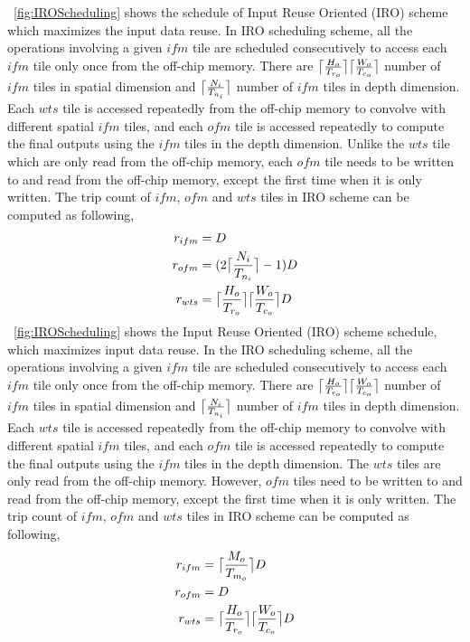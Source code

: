  \figurename~\ref{fig:IROScheduling} shows the schedule of Input Reuse Oriented (IRO) scheme which maximizes the input data reuse. In IRO scheduling scheme, all the operations involving a given $ifm$ tile are scheduled consecutively to access each $ifm$ tile only once from the off-chip memory. There are $\ceil[\big]{\frac{H_o}{T_{r_o}}}\ceil[\big]{\frac{W_o}{T_{c_o}}}$ number of $ifm$ tiles in spatial dimension and $\ceil[\big]{\frac{N_i}{T_{n_i}}}$ number of $ifm$ tiles in depth dimension. Each $wts$ tile is accessed repeatedly from the off-chip memory to convolve with different spatial $ifm$ tiles, and each $ofm$ tile is accessed repeatedly to compute the final outputs using the $ifm$ tiles in the depth dimension. Unlike the $wts$ tile which are only read from the off-chip memory, each $ofm$ tile needs to be written to and read from the off-chip memory, except the first time when it is only written. The trip count of $ifm$, $ofm$ and $wts$ tiles in IRO scheme can be computed as following,
\begin{align}\label{eq:IROTripCount}
	\begin{split}
	r_{ifm} &= D \\
	r_{ofm}&= (2\ceil[\big]{\frac{N_i}{T_{n_i}}}-1)D \\
	r_{wts} &= \ceil[\big]{\frac{H_o}{T_{r_o}}}\ceil[\big]{\frac{W_o}{T_{c_o}}}D
	\end{split}
\end{align}
 \figurename~\ref{fig:IROScheduling} shows the Input Reuse Oriented (IRO) scheme schedule, which maximizes input data reuse. In the IRO scheduling scheme, all the operations involving a given $ifm$ tile are scheduled consecutively to access each $ifm$ tile only once from the off-chip memory. There are $\ceil[\big]{\frac{H_o}{T_{r_o}}}\ceil[\big]{\frac{W_o}{T_{c_o}}}$ number of $ifm$ tiles in spatial dimension and $\ceil[\big]{\frac{N_i}{T_{n_i}}}$ number of $ifm$ tiles in depth dimension. Each $wts$ tile is accessed repeatedly from the off-chip memory to convolve with different spatial $ifm$ tiles, and each $ofm$ tile is accessed repeatedly to compute the final outputs using the $ifm$ tiles in the depth dimension. The $wts$ tiles are only read from the off-chip memory. However, $ofm$ tiles need to be written to and read from the off-chip memory, except the first time when it is only written. The trip count of $ifm$, $ofm$ and $wts$ tiles in IRO scheme can be computed as following,
\begin{align}\label{eq:OROTripCount}
	\begin{split}
		r_{ifm} &= \ceil[\big]{\frac{M_o}{T_{m_o}}}D \\
		r_{ofm}&= D \\
		r_{wts} &= \ceil[\big]{\frac{H_o}{T_{r_o}}}\ceil[\big]{\frac{W_o}{T_{c_o}}} D
	\end{split}
\end{align}
